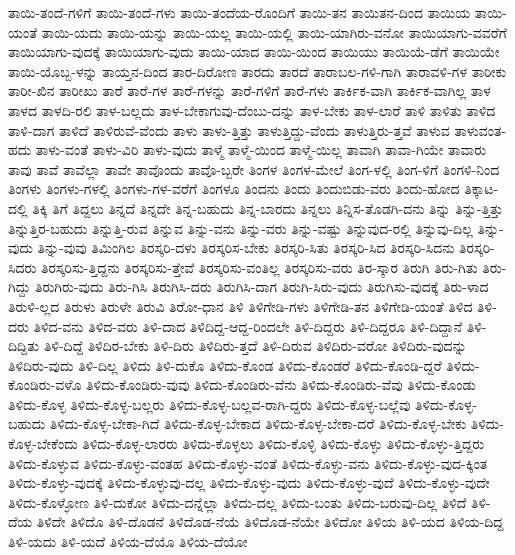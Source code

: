 {ತಾಯಿ-ತಂದೆ-ಗಳಿಗೆ
ತಾಯಿ-ತಂದೆ-ಗಳು
ತಾಯಿ-ತಂದೆಯ-ರೊಂದಿಗೆ
ತಾಯಿ-ತನ
ತಾಯಿತನ-ದಿಂದ
ತಾಯಿಯ
ತಾಯಿ-ಯಂತೆ
ತಾಯಿ-ಯದು
ತಾಯಿ-ಯನ್ನು
ತಾಯಿ-ಯಲ್ಲ
ತಾಯಿ-ಯಲ್ಲಿ
ತಾಯಿ-ಯಾಗಿರು-ವನೋ
ತಾಯಿಯಾಗು-ವವರೆಗೆ
ತಾಯಿಯಾಗು-ವುದಕ್ಕೆ
ತಾಯಿಯಾಗು-ವುದು
ತಾಯಿ-ಯಾದ
ತಾಯಿ-ಯಿಂದ
ತಾಯಿಯು
ತಾಯಿಯೆ-ಡೆಗೆ
ತಾಯಿಯೇ
ತಾಯಿ-ಯೊಬ್ಬ-ಳನ್ನು
ತಾಯ್ತನ-ದಿಂದ
ತಾರ-ದಿರೋಣ
ತಾರದು
ತಾರದೆ
ತಾರಾಬಲ-ಗಳಿ-ಗಾಗಿ
ತಾರಾವಳಿ-ಗಳ
ತಾರೀಕು
ತಾರೀ-ಖಿನ
ತಾರೀಖು
ತಾರೆ
ತಾರೆ-ಗಳ
ತಾರೆ-ಗಳನ್ನು
ತಾರೆ-ಗಳಿಗೆ
ತಾರೆ-ಗಳು
ತಾರ್ಕಿಕ-ವಾಗಿ
ತಾರ್ಕಿಕ-ವಾಗಿಲ್ಲ
ತಾಳ
ತಾಳದ
ತಾಳದಿ-ರಲಿ
ತಾಳ-ಬಲ್ಲದು
ತಾಳ-ಬೇಕಾಗುವು-ದೆಂಬು-ದನ್ನು
ತಾಳ-ಬೇಕು
ತಾಳ-ಲಾರೆ
ತಾಳಿ
ತಾಳಿತು
ತಾಳಿದ
ತಾಳಿ-ದಾಗ
ತಾಳಿದೆ
ತಾಳಿರುವೆ-ವೆಂದು
ತಾಳು
ತಾಳು-ತ್ತಿತ್ತು
ತಾಳುತ್ತಿದ್ದು-ವೆಂದು
ತಾಳುತ್ತಿರು-ತ್ತವೆ
ತಾಳುವ
ತಾಳುವಂತ-ಹದು
ತಾಳು-ವಂತೆ
ತಾಳು-ವಿರಿ
ತಾಳು-ವುದು
ತಾಳ್ಮೆ
ತಾಳ್ಮೆ-ಯಿಂದ
ತಾಳ್ಮೆ-ಯಿಲ್ಲ
ತಾವಾಗಿ
ತಾವಾ-ಗಿಯೇ
ತಾವಾರು
ತಾವು
ತಾವೆ
ತಾವೆಲ್ಲಾ
ತಾವೇ
ತಾವೊಂದು
ತಾವೊ-ಬ್ಬರೇ
ತಿಂಗಳ
ತಿಂಗಳ-ಮೇಲೆ
ತಿಂಗ-ಳಲ್ಲಿ
ತಿಂಗ-ಳಿಗೆ
ತಿಂಗಳಿ-ನಿಂದ
ತಿಂಗಳು
ತಿಂಗಳು-ಗಳಲ್ಲಿ
ತಿಂಗಳು-ಗಳ-ವರೆಗೆ
ತಿಂಗಳೂ
ತಿಂದನು
ತಿಂದು
ತಿಂದುಬಿಡು-ವರು
ತಿಂದು-ಹೋದ
ತಿಕ್ಕಾಟ-ದಲ್ಲಿ
ತಿಕ್ಕಿ
ತಿಗೆ
ತಿದ್ದಲು
ತಿನ್ನದೆ
ತಿನ್ನದೇ
ತಿನ್ನ-ಬಹುದು
ತಿನ್ನ-ಬಾರದು
ತಿನ್ನಲು
ತಿನ್ನಿಸ-ತೊಡಗಿ-ದನು
ತಿನ್ನು
ತಿನ್ನು-ತ್ತಿತ್ತು
ತಿನ್ನುತ್ತಿರ-ಬಹುದು
ತಿನ್ನುತ್ತಿ-ರುವ
ತಿನ್ನುವ
ತಿನ್ನು-ವನು
ತಿನ್ನು-ವರು
ತಿನ್ನು-ವಷ್ಟು
ತಿನ್ನುವುದ-ರಲ್ಲಿ
ತಿನ್ನುವು-ದಿಲ್ಲ
ತಿನ್ನು-ವುದು
ತಿನ್ನು-ವುವು
ತಿಮಿಂಗಿಲ
ತಿರಸ್ಕರಿ-ದಳು
ತಿರಸ್ಕರಿಸ-ಬೇಕು
ತಿರಸ್ಕರಿ-ಸಿತು
ತಿರಸ್ಕರಿ-ಸಿದ
ತಿರಸ್ಕರಿ-ಸಿದನು
ತಿರಸ್ಕರಿ-ಸಿದರು
ತಿರಸ್ಕರಿಸು-ತ್ತಿದ್ದನು
ತಿರಸ್ಕರಿಸು-ತ್ತೇವೆ
ತಿರಸ್ಕರಿಸು-ವಂತಿಲ್ಲ
ತಿರಸ್ಕರಿಸು-ವರು
ತಿರ-ಸ್ಕಾರ
ತಿರುಗಿ
ತಿರು-ಗಿತು
ತಿರು-ಗಿದ್ದು
ತಿರುಗಿರು-ವುದು
ತಿರು-ಗಿಸಿ
ತಿರುಗಿಸಿ-ದರು
ತಿರುಗಿಸಿ-ದಾಗ
ತಿರುಗಿ-ಸಿರು-ವುದು
ತಿರುಗಿಸು-ವುದಕ್ಕೆ
ತಿರು-ಳಾದ
ತಿರುಳಿ-ಲ್ಲದ
ತಿರುಳು
ತಿರುಳೇ
ತಿರುವಿ
ತಿರೋ-ಧಾನ
ತಿಳಿ
ತಿಳಿಗೇಡಿ-ಗಳು
ತಿಳಿಗೇಡಿ-ತನ
ತಿಳಿಗೇಡಿ-ಯಂತೆ
ತಿಳಿದ
ತಿಳಿ-ದರು
ತಿಳಿದ-ವನು
ತಿಳಿದ-ವರು
ತಿಳಿ-ದಾದ
ತಿಳಿದಿದ್ದ-ಆದ್ದ-ರಿಂದಲೇ
ತಿಳಿ-ದಿದ್ದರು
ತಿಳಿ-ದಿದ್ದರೂ
ತಿಳಿ-ದಿದ್ದಾನೆ
ತಿಳಿ-ದಿದ್ದಿತು
ತಿಳಿ-ದಿದ್ದೆ
ತಿಳಿದಿರ-ಬೇಕು
ತಿಳಿ-ದಿರು
ತಿಳಿದಿರು-ತ್ತದೆ
ತಿಳಿ-ದಿರುವ
ತಿಳಿದಿರು-ವರೋ
ತಿಳಿದಿರು-ವುದನ್ನು
ತಿಳಿದಿರು-ವುದು
ತಿಳಿ-ದಿಲ್ಲ
ತಿಳಿದು
ತಿಳಿ-ದುಕೊ
ತಿಳಿದು-ಕೊಂಡ
ತಿಳಿದು-ಕೊಂಡರೆ
ತಿಳಿದು-ಕೊಂಡಿ-ದ್ದರೆ
ತಿಳಿದು-ಕೊಂಡಿರು-ವಳೊ
ತಿಳಿದು-ಕೊಂಡಿರು-ವುವು
ತಿಳಿದು-ಕೊಂಡಿರು-ವೆನು
ತಿಳಿದು-ಕೊಂಡಿರು-ವೆವು
ತಿಳಿದು-ಕೊಂಡು
ತಿಳಿದು-ಕೊಳ್ಳ
ತಿಳಿದು-ಕೊಳ್ಳ-ಬಲ್ಲರು
ತಿಳಿದು-ಕೊಳ್ಳ-ಬಲ್ಲವ-ರಾಗಿ-ದ್ದರು
ತಿಳಿದು-ಕೊಳ್ಳ-ಬಲ್ಲೆವು
ತಿಳಿದು-ಕೊಳ್ಳ-ಬಹುದು
ತಿಳಿದು-ಕೊಳ್ಳ-ಬೇಕಾ-ಗಿದೆ
ತಿಳಿದು-ಕೊಳ್ಳ-ಬೇಕಾದ
ತಿಳಿದು-ಕೊಳ್ಳ-ಬೇಕಾ-ದರೆ
ತಿಳಿದು-ಕೊಳ್ಳ-ಬೇಕು
ತಿಳಿದು-ಕೊಳ್ಳ-ಬೇಕೆಂದು
ತಿಳಿದು-ಕೊಳ್ಳ-ಲಾರರು
ತಿಳಿದು-ಕೊಳ್ಳಲು
ತಿಳಿದು-ಕೊಳ್ಳಿ
ತಿಳಿದು-ಕೊಳ್ಳು
ತಿಳಿದು-ಕೊಳ್ಳು-ತ್ತಿದ್ದರು
ತಿಳಿದು-ಕೊಳ್ಳುವ
ತಿಳಿದು-ಕೊಳ್ಳು-ವಂತಹ
ತಿಳಿದು-ಕೊಳ್ಳು-ವಂತೆ
ತಿಳಿದು-ಕೊಳ್ಳು-ವನು
ತಿಳಿದು-ಕೊಳ್ಳು-ವುದ-ಕ್ಕಿಂತ
ತಿಳಿದು-ಕೊಳ್ಳು-ವುದಕ್ಕೆ
ತಿಳಿದು-ಕೊಳ್ಳುವು-ದಲ್ಲ
ತಿಳಿದು-ಕೊಳ್ಳು-ವುದು
ತಿಳಿದು-ಕೊಳ್ಳು-ವುದೆ
ತಿಳಿದು-ಕೊಳ್ಳು-ವುದೇ
ತಿಳಿದು-ಕೊಳ್ಳೋಣ
ತಿಳಿ-ದುಕೋ
ತಿಳಿದು-ದನ್ನೆಲ್ಲಾ
ತಿಳಿದು-ದಲ್ಲ
ತಿಳಿದು-ಬಂತು
ತಿಳಿದು-ಬರುವು-ದಿಲ್ಲ
ತಿಳಿದೆ
ತಿಳಿ-ದೆಯ
ತಿಳಿದೇ
ತಿಳಿದೊ
ತಿಳಿ-ದೊಡನೆ
ತಿಳಿದೊಡ-ನೆಯೆ
ತಿಳಿದೊಡ-ನೆಯೇ
ತಿಳಿದೋ
ತಿಳಿಯ
ತಿಳಿ-ಯದ
ತಿಳಿಯ-ದಿದ್ದ
ತಿಳಿ-ಯದು
ತಿಳಿ-ಯದೆ
ತಿಳಿಯ-ದೆಯೊ
ತಿಳಿಯ-ದೆಯೋ
}

